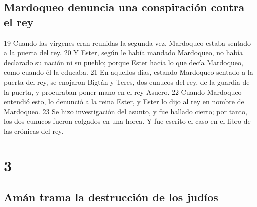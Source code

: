 \section*{Mardoqueo denuncia una conspiración contra el rey}

19 Cuando las vírgenes eran reunidas la segunda vez, Mardoqueo estaba sentado a la puerta del rey.
20 Y Ester, según le había mandado Mardoqueo, no había declarado su nación ni su pueblo; porque Ester hacía lo que decía Mardoqueo, como cuando él la educaba.
21 En aquellos días, estando Mardoqueo sentado a la puerta del rey, se enojaron Bigtán y Teres, dos eunucos del rey, de la guardia de la puerta, y procuraban poner mano en el rey Asuero.
22 Cuando Mardoqueo entendió esto, lo denunció a la reina Ester, y Ester lo dijo al rey en nombre de Mardoqueo.
23 Se hizo investigación del asunto, y fue hallado cierto; por tanto, los dos eunucos fueron colgados en una horca. Y fue escrito el caso en el libro de las crónicas del rey.

\chapter{3}

\section*{Amán trama la destrucción de los judíos}

